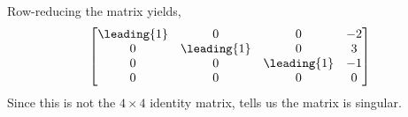Row-reducing the matrix yields,
%
\begin{equation*}
\begin{bmatrix}
\leading{1} & 0 & 0 & -2\\ 
0 & \leading{1} & 0 & 3\\ 
0 & 0 & \leading{1} & -1\\ 
0 & 0 & 0 & 0
\end{bmatrix}
\end{equation*}
%
Since this is not the $4\times 4$ identity matrix,  tells us the matrix is singular.
